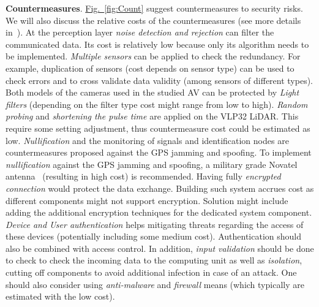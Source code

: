 \documentclass[runningheads]{llncs}
\begin{document}
\textbf{Countermeasures}. \hyperref[fig:Count]{Fig.~\ref{fig:Count}} suggest countermeasures to security risks. We will also discuss the relative costs of the countermeasures (see more details in~\cite{Rando2020}). At the perception layer \textit{noise detection and rejection} can filter the communicated data. Its cost is relatively low because only its algorithm needs to be implemented. \textit{Multiple sensors} can be applied to check the redundancy. For example, duplication of sensors (cost depends on sensor type) can be used to check errors and to cross validate data validity (among sensors of different types). Both models of the cameras used in the studied AV can be protected by \textit{Light filters} (depending on the filter type cost might range from low to high). \textit{Random probing} and \textit{shortening the pulse time} are applied on the VLP32 LiDAR. This require some setting adjustment, thus countermeasure cost could be estimated as low.  \textit{Nullification} and the monitoring of signals and identification nodes are countermeasures proposed against the GPS jamming and spoofing. To implement \textit{nullification} against the GPS jamming and spoofing, a military grade Novatel antenna~ (resulting in high cost) is recommended. Having fully \textit{encrypted connection} would protect the data exchange. Building such system accrues cost as different components might not support encryption. Solution might include adding the additional encryption techniques for the dedicated system component. \textit{Device and User authentication} helps mitigating threats regarding the access of these devices (potentially including some medium cost). Authentication should also be combined with access control. In addition, \textit{input validation} should be done to check to check the incoming data to the computing unit as well as \textit{isolation}, cutting off components to avoid additional infection in case of an attack. One should also consider using \textit{anti-malware} and \textit{firewall} means (which typically are estimated with the low cost). %
\end{document}

